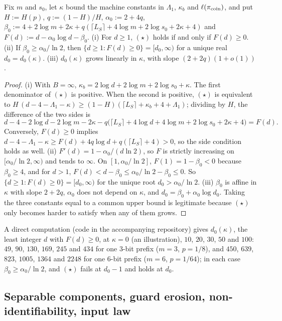 \begin{lemma}\label{lem:limits:robust}
Fix $m$ and $s_0$, let $\kappa$ bound the machine constants in $\Lambda_1$, $\kappa_b$ and $\ell(\pi_{\rm coin})$, and put $H:=H(p)$, $q:=(1-H)/H$, $\alpha_0:=2+4q$, $\beta_0:=4+2\log m+2\kappa+q(\lceil L_S\rceil+4\log m+2\log s_0+2\kappa+4)$ and $F(d):=d-\alpha_0\log d-\beta_0$. (i) For $d\ge1$, $(\star)$ holds if and only if $F(d)\ge0$. (ii) If $\beta_0\ge\alpha_0/\ln2$, then $\{d\ge1:F(d)\ge0\}=[d_0,\infty)$ for a unique real $d_0=d_0(\kappa)$. (iii) $d_0(\kappa)$ grows linearly in $\kappa$, with slope $(2+2q)(1+o(1))$.
\end{lemma}

\begin{proof}
(i) With $B=\infty$, $\kappa_b=2\log d+2\log m+2\log s_0+\kappa$. The first denominator of $(\star)$ is positive. When the second is positive, $(\star)$ is equivalent to $H\,(d-4-\Lambda_1-\kappa)\ge(1-H)(\lceil L_S\rceil+\kappa_b+4+\Lambda_1)$; dividing by $H$, the difference of the two sides is
\[
d-4-2\log d-2\log m-2\kappa-q\big(\lceil L_S\rceil+4\log d+4\log m+2\log s_0+2\kappa+4\big)=F(d).
\]
Conversely, $F(d)\ge0$ implies $d-4-\Lambda_1-\kappa\ge F(d)+4q\log d+q(\lceil L_S\rceil+4)>0$, so the side condition holds as well. (ii) $F'(d)=1-\alpha_0/(d\ln2)$, so $F$ is strictly increasing on $[\alpha_0/\ln2,\infty)$ and tends to $\infty$. On $[1,\alpha_0/\ln2]$, $F(1)=1-\beta_0<0$ because $\beta_0\ge4$, and for $d>1$, $F(d)<d-\beta_0\le\alpha_0/\ln2-\beta_0\le0$. So $\{d\ge1:F(d)\ge0\}=[d_0,\infty)$ for the unique root $d_0>\alpha_0/\ln2$. (iii) $\beta_0$ is affine in $\kappa$ with slope $2+2q$, $\alpha_0$ does not depend on $\kappa$, and $d_0=\beta_0+\alpha_0\log d_0$. Taking the three constants equal to a common upper bound is legitimate because $(\star)$ only becomes harder to satisfy when any of them grows.
\end{proof}

A direct computation (code in the accompanying repository) gives $d_0(\kappa)$, the least integer $d$ with $F(d)\ge0$, at $\kappa=0$ (an illustration), $10$, $20$, $30$, $50$ and $100$: $49$, $90$, $130$, $169$, $245$ and $434$ for one $3$-bit prefix ($m=3$, $p=1/8$), and $450$, $639$, $823$, $1005$, $1364$ and $2248$ for one $6$-bit prefix ($m=6$, $p=1/64$); in each case $\beta_0\ge\alpha_0/\ln2$, and $(\star)$ fails at $d_0-1$ and holds at $d_0$.

\subsection{Separable components, guard erosion, non-identifiability, input law}\label{app:limits:guard}


